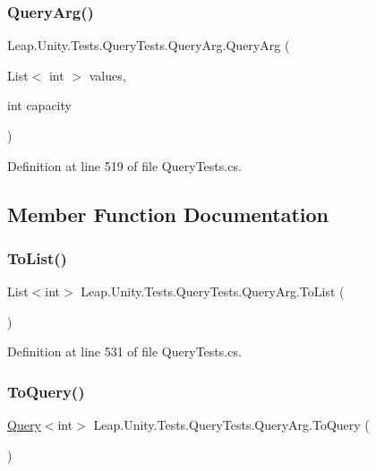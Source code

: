 \subsubsection{\texorpdfstring{QueryArg()}{QueryArg()}}
{\footnotesize\ttfamily Leap.\+Unity.\+Tests.\+Query\+Tests.\+Query\+Arg.\+Query\+Arg (\begin{DoxyParamCaption}\item[{List$<$ int $>$}]{values,  }\item[{int}]{capacity }\end{DoxyParamCaption})}



Definition at line 519 of file Query\+Tests.\+cs.



\subsection{Member Function Documentation}
\mbox{\label{class_leap_1_1_unity_1_1_tests_1_1_query_tests_1_1_query_arg_aea1ae78b9078dd2239e520e7ce4c8965}} 
\subsubsection{\texorpdfstring{ToList()}{ToList()}}
{\footnotesize\ttfamily List$<$int$>$ Leap.\+Unity.\+Tests.\+Query\+Tests.\+Query\+Arg.\+To\+List (\begin{DoxyParamCaption}{ }\end{DoxyParamCaption})}



Definition at line 531 of file Query\+Tests.\+cs.

\mbox{\label{class_leap_1_1_unity_1_1_tests_1_1_query_tests_1_1_query_arg_ab360ee1123e16be93d47af1bd1acd48a}} 
\subsubsection{\texorpdfstring{ToQuery()}{ToQuery()}}
{\footnotesize\ttfamily \mbox{\hyperlink{struct_leap_1_1_unity_1_1_query_1_1_query}{Query}}$<$int$>$ Leap.\+Unity.\+Tests.\+Query\+Tests.\+Query\+Arg.\+To\+Query (\begin{DoxyParamCaption}{ }\end{DoxyParamCaption})}




